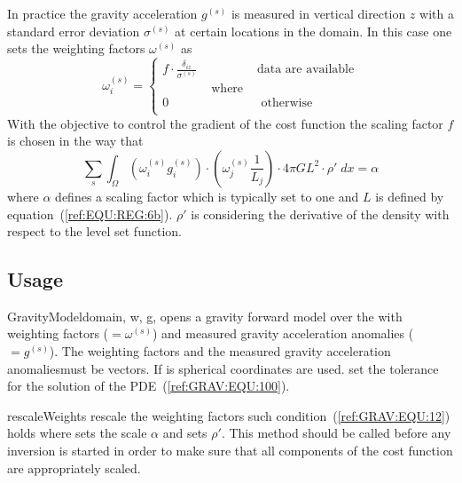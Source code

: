 In practice the gravity acceleration $g^{(s)}$ is measured in vertical
direction $z$ with a standard error deviation $\sigma^{(s)}$ at certain
locations in the domain.
In this case one sets the weighting factors $\omega^{(s)}$ as
\begin{equation}\label{ref:GRAV:EQU:11}
\omega^{(s)}_i 
= \left\{
\begin{array}{lcl}
f \cdot  \frac{\delta_{iz}}{\sigma^{(s)}} & & \mbox{data are available} \\
& \mbox{ where } & \\
0 & & \mbox{ otherwise } \\
\end{array}
\right.
\end{equation} 
With the objective to control the 
gradient of the cost function 
the scaling factor $f$ is chosen in the way that
\begin{equation}\label{ref:GRAV:EQU:12}
\sum_{s} \int_{\Omega} ( \omega^{(s)}_i g^{(s)}_i ) \cdot ( \omega^{(s)}_j \frac{1}{L_j} ) \cdot 4\pi G L^2 \cdot \rho' \;  dx =\alpha
\end{equation} 
where $\alpha$ defines a scaling factor which is typically set to one and $L$ is defined by equation~(\ref{ref:EQU:REG:6b}). $\rho'$ is considering the 
derivative of the density with respect to the level set function. 


\subsection{Usage}


\begin{classdesc}{GravityModel}{domain, 
w, g,
}
opens a gravity forward model over the \Domain {} with 
weighting factors  ($=\omega^{(s)}$) and measured gravity acceleration anomalies ($=g^{(s)}$).
The weighting factors and the  measured gravity acceleration anomalies\member must be vectors.
If  is \True spherical coordinates are used. 
 set the tolerance for the solution of the PDE~(\ref{ref:GRAV:EQU:100}).
\end{classdesc}

\begin{methoddesc}[GravityModel]{rescaleWeights}{
 }
rescale the weighting factors such condition~(\ref{ref:GRAV:EQU:12}) holds where 
 sets the scale $\alpha$
and  sets $\rho'$. This method should be called before any inversion is started
in order to make sure that all components of the cost function are appropriately scaled.
\end{methoddesc}



